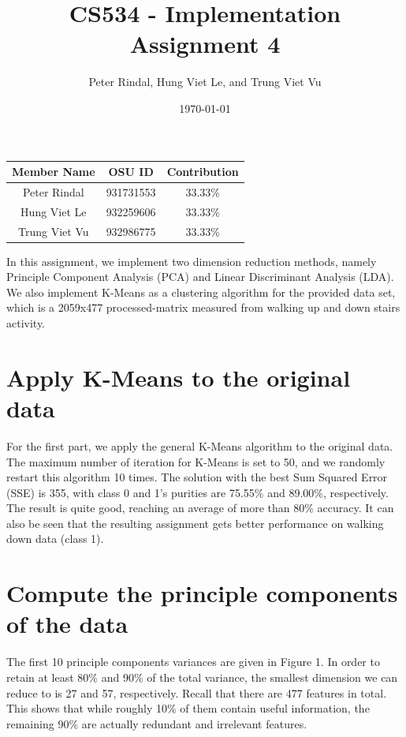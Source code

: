 \documentclass[a4paper]{article}
\title{CS534 - Implementation Assignment 4}
\date{\today}
\author{Peter Rindal, Hung Viet Le, and Trung Viet Vu}
\begin{document}
\maketitle



\begin{table}[H]
\begin{center}
  \begin{tabular}{ | c | c | c | }
    \hline
    Member Name & OSU ID & Contribution \\ \hline
    Peter Rindal & 931731553 & 33.33\% \\ \hline
    Hung Viet Le & 932259606 & 33.33\% \\ \hline
    Trung Viet Vu & 932986775 & 33.33\% \\
    \hline
  \end{tabular}
\end{center}
\end{table}

In this assignment, we implement two dimension reduction methods, namely Principle Component Analysis (PCA) and Linear Discriminant Analysis (LDA). We also implement K-Means as a clustering algorithm for the provided data set, which is a 2059x477 processed-matrix measured from walking up and down stairs activity.


\section{Apply K-Means to the original data}
For the first part, we apply the general K-Means algorithm to the original data. The maximum number of iteration for K-Means is set to 50, and we randomly restart this algorithm 10 times. The solution with the best Sum Squared Error (SSE) is 355, with class 0 and 1's purities are 75.55\% and 89.00\%, respectively.
The result is quite good, reaching an average of more than 80\% accuracy. It can also be seen that the resulting assignment gets better performance on walking down data (class 1).


\section{Compute the principle components of the data}
The first 10 principle components variances are given in Figure 1. In order to retain at least 80\% and 90\% of the total variance, the smallest dimension we can reduce to is 27 and 57, respectively. Recall that there are 477 features in total. This shows that while roughly 10\% of them contain useful information, the remaining 90\% are actually redundant and irrelevant features.
\end{document}
